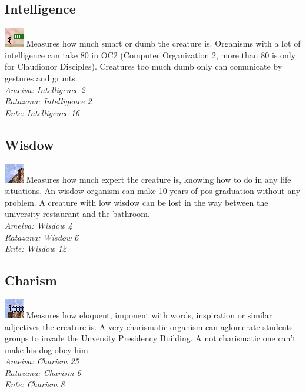 \documentclass[ letterpaper,12pt]{article}
\begin{document}
\subsection{Intelligence}
\includegraphics{../data/skills/Img/inteligencia.png}
Measures how much smart or dumb the creature is. Organisms with a lot of intelligence can take 80 in OC2 (Computer Organization 2, more than 80 is only for Claudionor Disciples). Creatures too much dumb only can comunicate by gestures and grunts.\\
{\it Ameiva: Intelligence 2\\
Ratazana: Intelligence 2\\
Ente: Intelligence 16\\}

\subsection{Wisdow}
\includegraphics{../data/skills/Img/sabedoria.png}
Measures how much expert the creature is, knowing how to do in any life situations. An wisdow organism can make 10 years of pos graduation without any problem. A creature with low wisdow can be lost in the way between the university restaurant and the bathroom.\\
{\it Ameiva: Wisdow 4\\
Ratazana: Wisdow 6\\
Ente: Wisdow 12}

\subsection{Charism}
\includegraphics{../data/skills/Img/carisma.png}
Measures how eloquent, imponent with words, inspiration or similar adjectives the creature is. A very charismatic organism can aglomerate students groups to invade the Unversity Presidency Building. A not charismatic one can't make his dog obey him.\\
{\it Ameiva: Charism 25\\
Ratazana: Charism 6\\
Ente: Charism 8}
\end{document}
